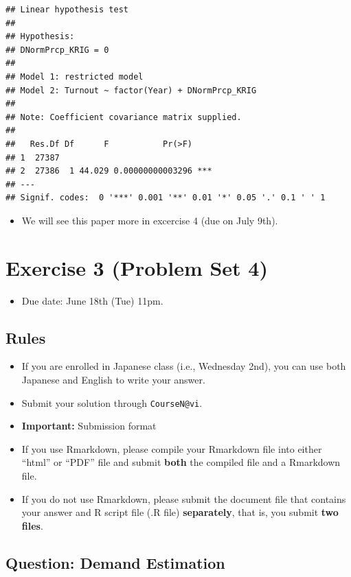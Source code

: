 \documentclass[]{book}
\providecommand{\tightlist}{%
  \setlength{\itemsep}{0pt}\setlength{\parskip}{0pt}}
\begin{document}
\begin{verbatim}
## Linear hypothesis test
## 
## Hypothesis:
## DNormPrcp_KRIG = 0
## 
## Model 1: restricted model
## Model 2: Turnout ~ factor(Year) + DNormPrcp_KRIG
## 
## Note: Coefficient covariance matrix supplied.
## 
##   Res.Df Df      F           Pr(>F)    
## 1  27387                               
## 2  27386  1 44.029 0.00000000003296 ***
## ---
## Signif. codes:  0 '***' 0.001 '**' 0.01 '*' 0.05 '.' 0.1 ' ' 1
\end{verbatim}

\begin{itemize}
\tightlist
\item
  We will see this paper more in excercise 4 (due on July 9th).
\end{itemize}

\chapter{Exercise 3 (Problem Set 4)}\label{exercise-3-problem-set-4}

\begin{itemize}
\tightlist
\item
  Due date: June 18th (Tue) 11pm.
\end{itemize}

\section{Rules}\label{rules-1}

\begin{itemize}
\tightlist
\item
  If you are enrolled in Japanese class (i.e., Wednesday 2nd), you can
  use both Japanese and English to write your answer.
\item
  Submit your solution through \texttt{CourseN@vi}.
\item
  \textbf{Important:} Submission format
\item
  If you use Rmarkdown, please compile your Rmarkdown file into either
  ``html'' or ``PDF'' file and submit \textbf{both} the compiled file
  and a Rmarkdown file.
\item
  If you do not use Rmarkdown, please submit the document file that
  contains your answer and R script file (.R file) \textbf{separately},
  that is, you submit \textbf{two files}.
\end{itemize}

\section{Question: Demand Estimation}\label{question-demand-estimation}
\end{document}
